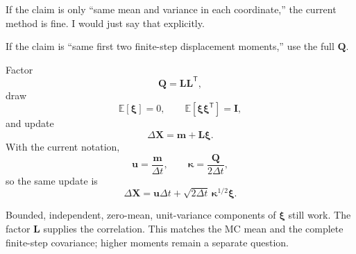 \documentclass[11pt]{article}
\newcommand{\ddX}{\Delta\mathbf{X}}
\newcommand{\mean}[1]{\mathbb{E}\!\left[#1\right]}
\begin{document}
If the claim is only ``same mean and variance in each coordinate,'' the current
method is fine. I would just say that explicitly.

If the claim is ``same first two finite-step displacement moments,'' use the
full \(\mathbf{Q}\).

Factor
\begin{equation}
  \mathbf{Q}=\mathbf{L}\mathbf{L}^{\mathsf T},
\end{equation}
draw
\begin{equation}
  \mean{\boldsymbol{\xi}}=0,
  \qquad
  \mean{\boldsymbol{\xi}\boldsymbol{\xi}^{\mathsf T}}=\mathbf{I},
\end{equation}
and update
\begin{equation}
  \boxed{
  \ddX
  =
  \mathbf{m}
  +
  \mathbf{L}\boldsymbol{\xi}.
  }
\end{equation}
With the current notation,
\begin{equation}
  \mathbf{u}=\frac{\mathbf{m}}{\Delta t},
  \qquad
  \boldsymbol{\kappa}=\frac{\mathbf{Q}}{2\Delta t},
\end{equation}
so the same update is
\begin{equation}
  \ddX
  =
  \mathbf{u}\Delta t
  +
  \sqrt{2\Delta t}\,
  \boldsymbol{\kappa}^{1/2}\boldsymbol{\xi}.
\end{equation}

Bounded, independent, zero-mean, unit-variance components of
\(\boldsymbol{\xi}\) still work. The factor \(\mathbf{L}\) supplies the
correlation. This matches the MC mean and the complete finite-step covariance;
higher moments remain a separate question.

\medskip
\noindent{}
\end{document}
